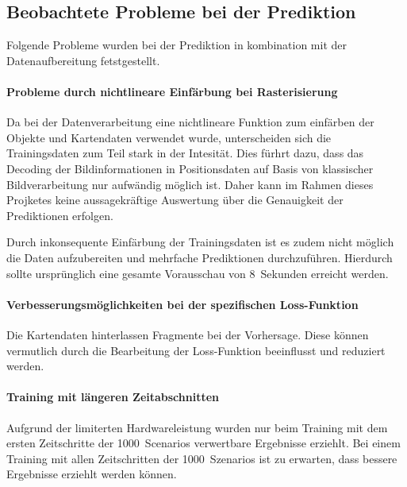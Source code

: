 \documentclass[12pt]{article}
\begin{document}
    \subsection{Beobachtete Probleme bei der Prediktion}
        Folgende Probleme wurden bei der Prediktion in kombination mit der Datenaufbereitung fetstgestellt.
        
        \paragraph{Probleme durch nichtlineare Einfärbung bei Rasterisierung} Da bei der Datenverarbeitung eine 
        nichtlineare Funktion zum einfärben der Objekte und Kartendaten verwendet wurde, unterscheiden sich die Trainingsdaten 
        zum Teil stark in der Intesität. Dies fürhrt dazu, dass das Decoding der Bildinformationen in Positionsdaten auf 
        Basis von klassischer Bildverarbeitung nur aufwändig möglich ist. Daher kann im Rahmen dieses Projketes keine aussagekräftige 
        Auswertung über die Genauigkeit der Prediktionen erfolgen.

        Durch inkonsequente Einfärbung der Trainingsdaten ist es zudem nicht möglich die Daten aufzubereiten und mehrfache Prediktionen durchzuführen.
        Hierdurch sollte ursprünglich eine gesamte Vorausschau von 8~Sekunden erreicht werden.

        \paragraph{Verbesserungsmöglichkeiten bei der spezifischen Loss-Funktion} Die Kartendaten hinterlassen Fragmente bei der Vorhersage. 
        Diese können vermutlich durch die Bearbeitung der Loss-Funktion beeinflusst und reduziert werden.
        \paragraph{Training mit längeren Zeitabschnitten} Aufgrund der limiterten Hardwareleistung wurden nur beim Training mit dem ersten 
        Zeitschritte der 1000~Scenarios verwertbare Ergebnisse erziehlt. Bei einem Training mit allen Zeitschritten der 1000~Szenarios ist zu erwarten, 
        dass bessere Ergebnisse erziehlt werden können.
\end{document}
